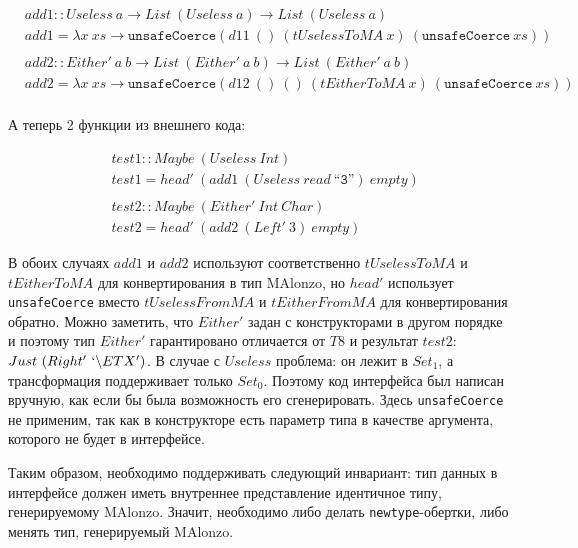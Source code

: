 \begin{align*}
\\
&add1 :: Useless\ a \rightarrow List\ (Useless\ a) \rightarrow List\ (Useless\ a)\\
&add1 = \lambda x\ xs \rightarrow \texttt{unsafeCoerce} (d11\ () \ (
   tUselessToMA\ x)\ (\texttt{unsafeCoerce}\ xs))\\
\\
&add2 :: Either'\ a\ b \rightarrow List\ (Either'\ a\ b) \rightarrow
   List\ (Either'\ a\ b)\\
&add2 = \lambda x\ xs \rightarrow \texttt{unsafeCoerce} (d12\ ()\ () \ (
   tEitherToMA\ x)\ (\texttt{unsafeCoerce}\ xs))\\
\end{align*}

А теперь 2 функции из внешнего кода:

\begin{align*}
&test1 :: Maybe\ (Useless\ Int)\\
&test1 = head'\ (add1\ (Useless\ read\ \texttt{``3''})\ empty)\\
\\
&test2 :: Maybe\ (Either'\ Int\ Char)\\
&test2 = head'\ (add2\ (Left'\ 3)\ empty)
\end{align*}

В обоих случаях \(add1\) и \(add2\) используют соответственно \(tUselessToMA\) и
\(tEitherToMA\) для конвертирования в тип MAlonzo, но \(head'\) использует
\texttt{unsafeCoerce} вместо \(tUselessFromMA\) и \(tEitherFromMA\) для
конвертирования обратно. Можно заметить, что \(Either'\) задан с конструкторами
в другом порядке и поэтому тип \(Either'\) гарантировано отличается от \(T8\)
и результат \(test2\): \(Just\ (Right'\ `\backslash ETX')\). В случае с
\(Useless\) проблема: он лежит в \(Set_1\), а трансформация поддерживает только
\(Set_0\). Поэтому код интерфейса был написан вручную, как если бы была возможность
его сгенерировать. Здесь \texttt{unsafeCoerce} не применим, так как в конструкторе
есть параметр типа в качестве аргумента, которого не будет в интерфейсе.

Таким образом, необходимо поддерживать следующий инвариант: тип данных в интерфейсе
должен иметь внутреннее представление идентичное типу, генерируемому MAlonzo. Значит,
необходимо либо делать \texttt{newtype}-обертки, либо менять тип, генерируемый
MAlonzo.
